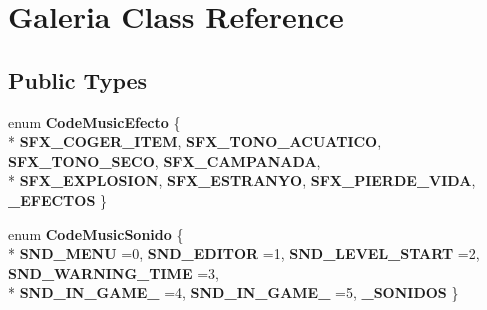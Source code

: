 \hypertarget{class_galeria}{}\section{Galeria Class Reference}
\label{class_galeria}
\subsection*{Public Types}
\begin{DoxyCompactItemize}
\item 
enum {\bfseries Code\+Music\+Efecto} \{ \\*
{\bfseries S\+F\+X\+\_\+\+C\+O\+G\+E\+R\+\_\+\+I\+T\+EM}, 
{\bfseries S\+F\+X\+\_\+\+T\+O\+N\+O\+\_\+\+A\+C\+U\+A\+T\+I\+CO}, 
{\bfseries S\+F\+X\+\_\+\+T\+O\+N\+O\+\_\+\+S\+E\+CO}, 
{\bfseries S\+F\+X\+\_\+\+C\+A\+M\+P\+A\+N\+A\+DA}, 
\\*
{\bfseries S\+F\+X\+\_\+\+E\+X\+P\+L\+O\+S\+I\+ON}, 
{\bfseries S\+F\+X\+\_\+\+E\+S\+T\+R\+A\+N\+YO}, 
{\bfseries S\+F\+X\+\_\+\+P\+I\+E\+R\+D\+E\+\_\+\+V\+I\+DA}, 
{\bfseries \+\_\+\+E\+F\+E\+C\+T\+OS}
 \}\hypertarget{class_galeria_a5545af8ffe889df8033ea5ac09d8f61d}{}\label{class_galeria_a5545af8ffe889df8033ea5ac09d8f61d}

\item 
enum {\bfseries Code\+Music\+Sonido} \{ \\*
{\bfseries S\+N\+D\+\_\+\+M\+E\+NU} =0, 
{\bfseries S\+N\+D\+\_\+\+E\+D\+I\+T\+OR} =1, 
{\bfseries S\+N\+D\+\_\+\+L\+E\+V\+E\+L\+\_\+\+S\+T\+A\+RT} =2, 
{\bfseries S\+N\+D\+\_\+\+W\+A\+R\+N\+I\+N\+G\+\_\+\+T\+I\+ME} =3, 
\\*
{\bfseries S\+N\+D\+\_\+\+I\+N\+\_\+\+G\+A\+M\+E\+\_} =4, 
{\bfseries S\+N\+D\+\_\+\+I\+N\+\_\+\+G\+A\+M\+E\+\_} =5, 
{\bfseries \+\_\+\+S\+O\+N\+I\+D\+OS}
 \}\hypertarget{class_galeria_a3f36d29a45086825cf197f043e1bf810}{}\label{class_galeria_a3f36d29a45086825cf197f043e1bf810}


\end{DoxyCompactItemize}
